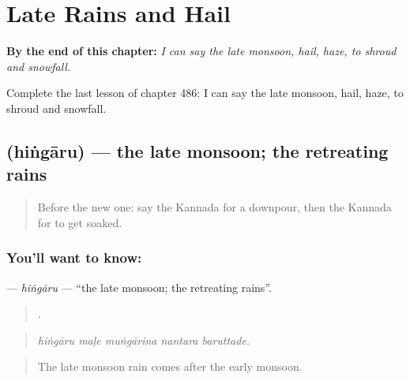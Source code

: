 
\chapter{Late Rains and Hail}
\label{ch:ka-late-rains-and-hail}

\begin{chapteropening}
\textbf{By the end of this chapter:} \emph{I can say the late monsoon, hail, haze, to shroud and snowfall.}

Complete the last lesson of chapter 486: I can say the late monsoon, hail, haze, to shroud and snowfall.
\end{chapteropening}

\section[\texorpdfstring{\kn{ಹಿಂಗಾರು} (hiṅgāru)}{ಹಿಂಗಾರು (hiṅgāru)}]{ (hiṅgāru) — the late monsoon; the retreating rains}

\label{lesson:KA-C486-hingaru}



\begin{quote}
Before the new one: say the Kannada for a downpour, then the Kannada for to get soaked.
\end{quote}

\subsection*{You'll want to know: }
\textbf{} — \emph{hiṅgāru} — \textquotedblleft{}the late monsoon; the retreating rains\textquotedblright{}.

\begin{quote}
    .
\end{quote}

\begin{quote}
\emph{hiṅgāru maḷe muṅgārina nantara baruttade.}
\end{quote}

\begin{quote}
The late monsoon rain comes after the early monsoon.
\end{quote}

